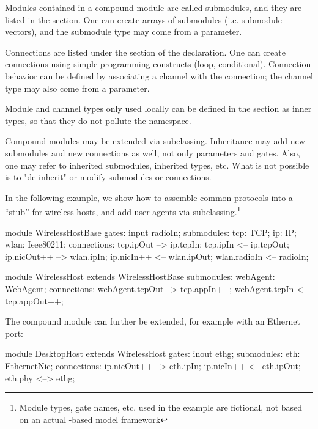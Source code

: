 Modules contained in a compound module are called submodules, and they are
listed in the  section. One can create arrays of submodules
(i.e. submodule vectors), and the submodule type may come from a parameter.

Connections are listed under the  section of the
declaration. One can create connections using simple programming constructs
(loop, conditional). Connection behavior can be defined by associating a
channel with the connection; the channel type may also come from a
parameter.

Module and channel types only used locally can be defined in the
 section as inner types, so that they do not pollute the
namespace.

Compound modules may be extended via subclassing. Inheritance may add new
submodules and new connections as well, not only parameters and gates.
Also, one may refer to inherited submodules, inherited types, etc. What
is not possible is to "de-inherit" or modify submodules or connections.

In the following example, we show how to assemble common protocols into a ``stub''
for wireless hosts, and add user agents via subclassing.\footnote{Module types,
gate names, etc. used in the example are fictional, not based on an actual
{\opp}-based model framework}

\begin{ned}
module WirelessHostBase
{
   gates:
       input radioIn;
   submodules:
       tcp: TCP;
       ip: IP;
       wlan: Ieee80211;
   connections:
       tcp.ipOut --> ip.tcpIn;
       tcp.ipIn <-- ip.tcpOut;
       ip.nicOut++ --> wlan.ipIn;
       ip.nicIn++ <-- wlan.ipOut;
       wlan.radioIn <-- radioIn;
}

module WirelessHost extends WirelessHostBase
{
   submodules:
       webAgent: WebAgent;
   connections:
       webAgent.tcpOut --> tcp.appIn++;
       webAgent.tcpIn <-- tcp.appOut++;
}
\end{ned}

The  compound module can further be extended,
for example with an Ethernet port:

\begin{ned}
module DesktopHost extends WirelessHost
{
   gates:
       inout ethg;
   submodules:
       eth: EthernetNic;
   connections:
       ip.nicOut++ --> eth.ipIn;
       ip.nicIn++ <-- eth.ipOut;
       eth.phy <--> ethg;
}
\end{ned}



